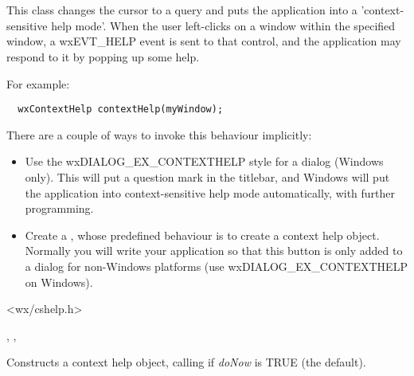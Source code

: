 \section{}\label{wxcontexthelp}

This class changes the cursor to a query and puts the application into a 'context-sensitive help mode'.
When the user left-clicks on a window within the specified window, a wxEVT\_HELP event is
sent to that control, and the application may respond to it by popping up some help.

For example:

\begin{verbatim}
  wxContextHelp contextHelp(myWindow);
\end{verbatim}

There are a couple of ways to invoke this behaviour implicitly:

\begin{itemize}
\item Use the wxDIALOG\_EX\_CONTEXTHELP style for a dialog (Windows only). This will put a question mark
in the titlebar, and Windows will put the application into context-sensitive help mode automatically,
with further programming.
\item Create a , whose predefined behaviour is to create a context help object.
Normally you will write your application so that this button is only added to a dialog for non-Windows platforms
(use wxDIALOG\_EX\_CONTEXTHELP on Windows).
\end{itemize}




<wx/cshelp.h>


, 
, 




Constructs a context help object, calling  if\rtfsp
{\it doNow} is TRUE (the default).

